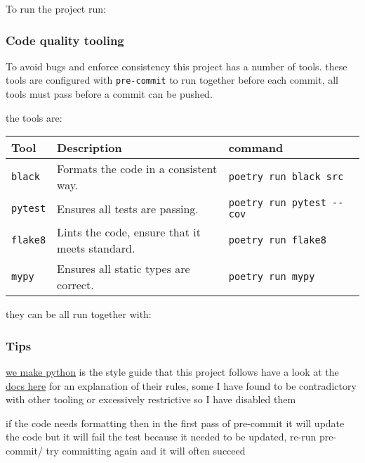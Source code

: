 To run the project run:

\begin{Shaded}
\begin{Highlighting}[]
\end{Highlighting}
\end{Shaded}

\hypertarget{code-quality-tooling}{%
\subsubsection{Code quality tooling}\label{code-quality-tooling}}

To avoid bugs and enforce consistency this project has a number of
tools. these tools are configured with \texttt{pre-commit} to run
together before each commit, all tools must pass before a commit can be
pushed.

the tools are:

\begin{longtable}[]{@{}lll@{}}
\toprule
Tool & Description & command\tabularnewline
\midrule
\endhead
\texttt{black} & Formats the code in a consistent way. &
\texttt{poetry\ run\ black\ src}\tabularnewline
\texttt{pytest} & Ensures all tests are passing. &
\texttt{poetry\ run\ pytest\ -\/-cov}\tabularnewline
\texttt{flake8} & Lints the code, ensure that it meets standard. &
\texttt{poetry\ run\ flake8}\tabularnewline
\texttt{mypy} & Ensures all static types are correct. &
\texttt{poetry\ run\ mypy}\tabularnewline
\bottomrule
\end{longtable}

they can be all run together with:

\begin{Shaded}
\begin{Highlighting}[]
\end{Highlighting}
\end{Shaded}

\hypertarget{tips}{%
\subsubsection{Tips}\label{tips}}

\href{https://readthedocs.org/projects/wemake-python-styleguide/}{we
make python} is the style guide that this project follows have a look at
the
\href{https://wemake-python-styleguide.readthedocs.io/en/latest/}{docs
here} for an explanation of their rules, some I have found to be
contradictory with other tooling or excessively restrictive so I have
disabled them

if the code needs formatting then in the first pass of pre-commit it
will update the code but it will fail the test because it needed to be
updated, re-run pre-commit/ try committing again and it will often
succeed
